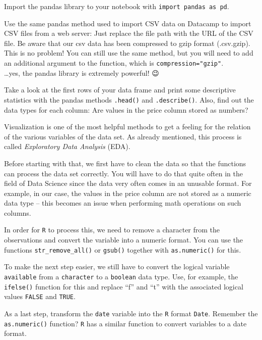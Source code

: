 \documentclass[
  11pt,
]{article}
\newenvironment{tips}[1]
  {
  \begin{itemize}
  \footnotesize
  \renewcommand{\labelitemi}{
    \raisebox{-.7\height}[0pt][0pt]{
      {\setkeys{Gin}{width=3em,keepaspectratio}
        \texttt{[image: images/\#1.png]}}
    }
  }
  \setlength{\fboxsep}{1em}
  \begin{rbox}
  \item
  }
  {
  \end{rbox}
  \end{itemize}
  }
\newenvironment{tipsp}[1]
  {
  \begin{itemize}
  \footnotesize
  \renewcommand{\labelitemi}{
    \raisebox{-.7\height}[0pt][0pt]{
      {\setkeys{Gin}{width=3em,keepaspectratio}
        \texttt{[image: images/\#1.png]}}
    }
  }
  \setlength{\fboxsep}{1em}
  \begin{pbox}
  \item
  }
  {
  \end{pbox}
  \end{itemize}
  }
\begin{document}
\begin{tipsp}p
Import the pandas library to your notebook with \texttt{import\ pandas\ as\ pd}.

Use the same pandas method used to import CSV data on Datacamp to import CSV files from a web server: Just replace the file path with the URL of the CSV file. Be aware that our csv data has been compressed to gzip format (.csv.gzip). This is no problem! You can still use the same method, but you will need to add an additional argument to the function, which is \texttt{compression="gzip"}.\\
\ldots yes, the pandas library is extremely powerful! 😉

Take a look at the first rows of your data frame and print some descriptive statistics with the pandas methods \texttt{.head()} and \texttt{.describe()}.
Also, find out the data types for each column: Are values in the price column stored as numbers?

\end{tipsp}

Visualization is one of the most helpful methods to get a feeling for the relation of the various variables of the data set.
As already mentioned, this process is called \emph{Exploratory Data Analysis} (EDA).

Before starting with that, we first have to clean the data so that the functions can process the data set correctly.
You will have to do that quite often in the field of Data Science since the data very often comes in an unusable format.
For example, in our case, the values in the price column are not stored as a numeric data type -- this becomes an issue when performing math operations on such columns.

\begin{tips}r
In order for \texttt{R} to process this, we need to remove a character from the observations and convert the variable into a numeric format.
You can use the functions \texttt{str\_remove\_all()} or \texttt{gsub()} together with \texttt{as.numeric()} for this.

To make the next step easier, we still have to convert the logical variable \texttt{available} from a \texttt{character} to a \texttt{boolean} data type.
Use, for example, the \texttt{ifelse()} function for this and replace ``f'' and ``t'' with the associated logical values \texttt{FALSE} and \texttt{TRUE}.

As a last step, transform the \texttt{date} variable into the \texttt{R} format \texttt{Date}.
Remember the \texttt{as.numeric()} function?
\texttt{R} has a similar function to convert variables to a date format.

\end{tips}
\end{document}
